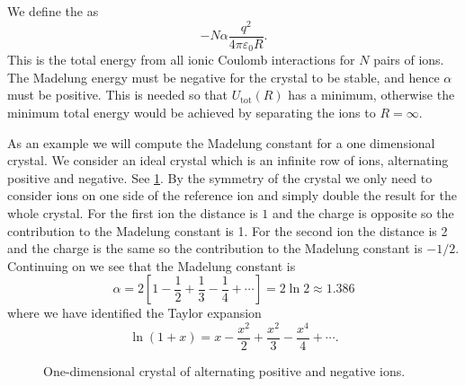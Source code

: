 \documentclass[fleqn]{NotesClass}
\newcommand*{\tot}{\mathrm{tot}}
\begin{document}
    We define the  as
    \begin{equation}
        -N\alpha\frac{q^2}{4\pi\varepsilon_0R}.
    \end{equation}
    This is the total energy from all ionic Coulomb interactions for \(N\) pairs of ions.
    The Madelung energy must be negative for the crystal to be stable, and hence \(\alpha\) must be positive.
    This is needed so that \(U_{\tot}(R)\) has a minimum, otherwise the minimum total energy would be achieved by separating the ions to \(R = \infty\).
    
    As an example we will compute the Madelung constant for a one dimensional crystal.
    We consider an ideal crystal which is an infinite row of ions, alternating positive and negative.
    See \cref{fig:1d ionic crystal}.
    By the symmetry of the crystal we only need to consider ions on one side of the reference ion and simply double the result for the whole crystal.
    For the first ion the distance is \(1\) and the charge is opposite so the contribution to the Madelung constant is 1.
    For the second ion the distance is 2 and the charge is the same so the contribution to the Madelung constant is \(-1/2\).
    Continuing on we see that the Madelung constant is
    \begin{equation}
        \alpha = 2\left[ 1 - \frac{1}{2} + \frac{1}{3} - \frac{1}{4} + \dotsb \right] = 2\ln 2 \approx 1.386
    \end{equation}
    where we have identified the Taylor expansion
    \begin{equation}
        \ln(1 + x) = x - \frac{x^2}{2} + \frac{x^2}{3} - \frac{x^4}{4} + \dotsb.
    \end{equation}
    
    \begin{figure}
        \caption[One-dimensional ionic crystal.]{One-dimensional crystal of alternating positive and negative ions.}
        \label{fig:1d ionic crystal}
    \end{figure}
    
\end{document}
